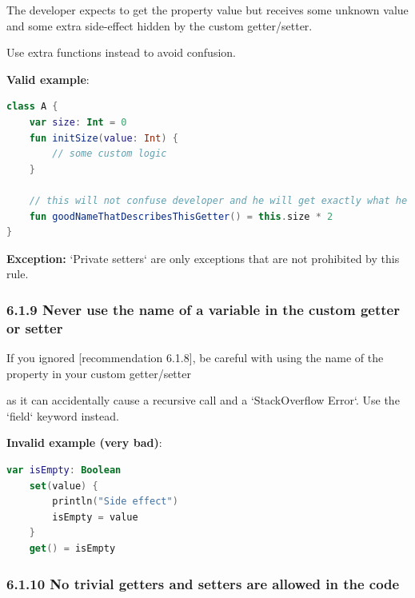 {{{{The developer expects to get the property value but receives some unknown value and some extra side-effect hidden by the custom getter/setter. 

Use extra functions instead to avoid confusion.







\textbf{Valid example}:

\begin{lstlisting}[language=Kotlin]
class A {
    var size: Int = 0
    fun initSize(value: Int) {
        // some custom logic
    }
    
    // this will not confuse developer and he will get exactly what he expects    
    fun goodNameThatDescribesThisGetter() = this.size * 2
}
\end{lstlisting}


\textbf{Exception:} `Private setters` are only exceptions that are not prohibited by this rule.



\subsubsection*{\textbf{6.1.9 Never use the name of a variable in the custom getter or setter}}
\leavevmode\newline

\label{sec:6.1.9}

If you ignored [recommendation 6.1.8], be careful with using the name of the property in your custom getter/setter

as it can accidentally cause a recursive call and a `StackOverflow Error`. Use the `field` keyword instead.



\textbf{Invalid example (very bad)}:

\begin{lstlisting}[language=Kotlin]
var isEmpty: Boolean
    set(value) {
        println("Side effect")
        isEmpty = value
    }
    get() = isEmpty
\end{lstlisting}


\subsubsection*{\textbf{6.1.10 No trivial getters and setters are allowed in the code}}
\leavevmode\newline

\label{sec:6.1.10}

}}}}
